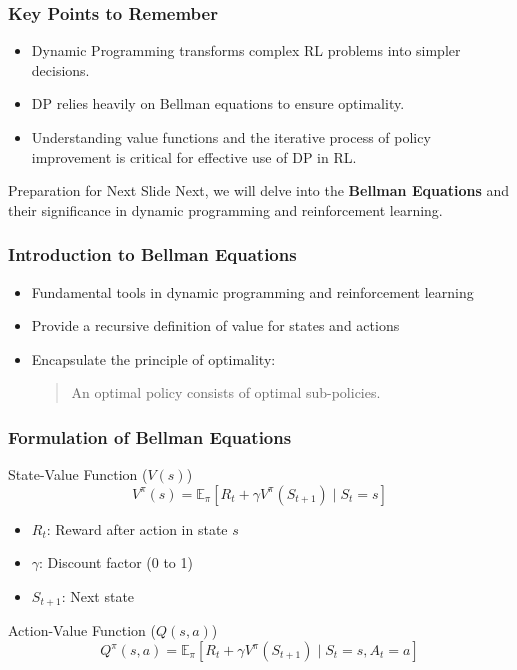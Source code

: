 \documentclass[aspectratio=169]{beamer}
\begin{document}
\begin{frame}[fragile]
  \frametitle{Key Points to Remember}
  \begin{itemize}
    \item Dynamic Programming transforms complex RL problems into simpler decisions.
    \item DP relies heavily on Bellman equations to ensure optimality.
    \item Understanding value functions and the iterative process of policy improvement is critical for effective use of DP in RL.
  \end{itemize}
  
  \begin{block}{Preparation for Next Slide}
    Next, we will delve into the \textbf{Bellman Equations} and their significance in dynamic programming and reinforcement learning.
  \end{block}
\end{frame}

\begin{frame}[fragile]
  \frametitle{Introduction to Bellman Equations}
  \begin{itemize}
    \item Fundamental tools in dynamic programming and reinforcement learning
    \item Provide a recursive definition of value for states and actions
    \item Encapsulate the principle of optimality:
    \begin{quote}
      An optimal policy consists of optimal sub-policies.
    \end{quote}
  \end{itemize}
\end{frame}

\begin{frame}[fragile]
  \frametitle{Formulation of Bellman Equations}
  \begin{block}{State-Value Function (\(V(s)\))}
    \begin{equation}
      V^\pi(s) = \mathbb{E}_\pi \left[ R_t + \gamma V^\pi(S_{t+1}) \mid S_t = s \right]
    \end{equation}
    \begin{itemize}
      \item \(R_t\): Reward after action in state \(s\)
      \item \(\gamma\): Discount factor (0 to 1)
      \item \(S_{t+1}\): Next state
    \end{itemize}
  \end{block}

  \begin{block}{Action-Value Function (\(Q(s, a)\))}
    \begin{equation}
      Q^\pi(s, a) = \mathbb{E}_\pi \left[ R_t + \gamma V^\pi(S_{t+1}) \mid S_t = s, A_t = a \right]
    \end{equation}
  \end{block}
\end{frame}
\end{document}
